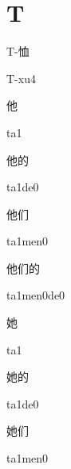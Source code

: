 ﻿%
\section*{T}
\begin{multicols*}{2}

\begin{verbete}[T-xu4]{T-恤}
\begin{pronuncia}{T-xu4}
\end{pronuncia}
\end{verbete}

\begin{verbete}[ta1]{他}
\begin{pronuncia}{ta1}
\end{pronuncia}
\end{verbete}

\begin{verbete}[ta1de0]{他的}
\begin{pronuncia}{ta1de0}
\end{pronuncia}
\end{verbete}

\begin{verbete}[ta1men0]{他们}
\begin{pronuncia}{ta1men0}
\end{pronuncia}
\end{verbete}

\begin{verbete}[ta1men0de0]{他们的}
\begin{pronuncia}{ta1men0de0}
\end{pronuncia}
\end{verbete}

\begin{verbete}[ta1]{她}
\begin{pronuncia}{ta1}
\end{pronuncia}
\end{verbete}

\begin{verbete}[ta1de0]{她的}
\begin{pronuncia}{ta1de0}
\end{pronuncia}
\end{verbete}

\begin{verbete}[ta1men0]{她们}
\begin{pronuncia}{ta1men0}
\end{pronuncia}
\end{verbete}


\end{multicols*}
